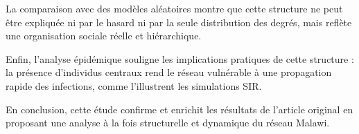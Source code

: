 \documentclass[10pt,twocolumn]{article}
\begin{document}
La comparaison avec des modèles aléatoires montre que cette structure ne peut être
expliquée ni par le hasard ni par la seule distribution des degrés, mais reflète une
organisation sociale réelle et hiérarchique.

Enfin, l’analyse épidémique souligne les implications pratiques de cette structure :
la présence d’individus centraux rend le réseau vulnérable à une propagation rapide
des infections, comme l’illustrent les simulations SIR.

En conclusion, cette étude confirme et enrichit les résultats de l’article original
en proposant une analyse à la fois structurelle et dynamique du réseau Malawi.
\end{document}

